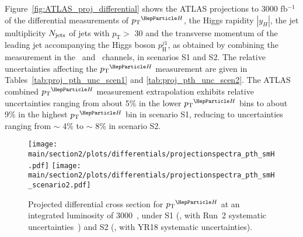 Figure~\ref{fig:ATLAS_proj_differential} shows the ATLAS projections to 3000 fb$^{-1}$ of the differential measurements of $\pTH$, the Higgs rapidity $|y_H|$, the jet multiplicity $N_{\rm jets}$ of jets with $p_{\mathrm{T}} >$ 30 \UGeV and the transverse momentum of the leading jet accompanying the Higgs boson $p_{\mathrm{H}}^{j1}$, as obtained by combining the measurement in the \Hyy\ and \HZZ\ channels, in scenarios S1 and S2. The relative uncertainties affecting the $\pTH$ measurement are given in Tables~\ref{tab:proj_pth_unc_scen1} and \ref{tab:proj_pth_unc_scen2}.
The ATLAS combined $\pTH$ measurement extrapolation exhibits relative uncertainties ranging from about 5\% in the lower $\pTH$ bins to about 9\% in the highest $\pTH$ bin in scenario S1, reducing to uncertainties ranging from $\sim$ 4\% to $\sim$ 8\% in scenario S2.

\begin{figure}%
  \begin{center}
    \texttt{[image: \\main/section2/plots/differentials/projectionspectra\_pth\_smH.pdf]}
    \texttt{[image: \\main/section2/plots/differentials/projectionspectra\_pth\_smH\_scenario2.pdf]}
    \caption{
        Projected differential cross section for $\pTH$ at an integrated luminosity of 3000\fbinv ~\cite{Sirunyan:2018sgc}, under S1 (\UcmsLeft, with Run~2 systematic uncertainties~\cite{CMS-PAS-HIG-17-028}) and S2 (\UcmsRight, with YR18 systematic uncertainties).
        }
    \label{fig:proj_pth}
  \end{center}
\end{figure}


